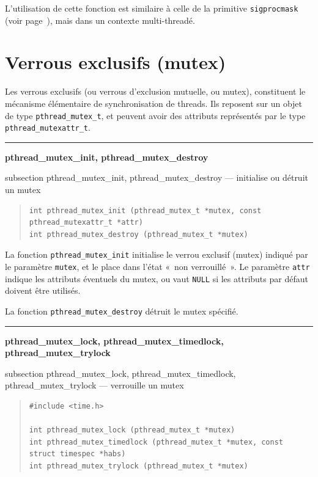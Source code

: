 \documentclass [twoside] {report}
\newcommand {\primitive} [1]
    {
	\phantomsection
	{\large \textbf {#1}}
	\addcontentsline {toc} {subsection} {#1}
    }
\newcommand {\separation}
    {
	\vspace {5mm}
	\nopagebreak
	\hrule
    }
\begin{document}
L'utilisation de cette fonction est similaire à celle de la primitive
\texttt {sigprocmask} (voir page~\pageref {sigprocmask}), mais dans un
contexte multi-threadé.


\section {Verrous exclusifs (mutex)}

Les verrous exclusifs (ou verrous d'exclusion mutuelle, ou mutex),
constituent le mécanisme élémentaire de synchronisation de threads. Ils
reposent sur un objet de type \verb|pthread_mutex_t|, et peuvent avoir
des attributs représentés par le type \verb|pthread_mutexattr_t|.

\separation
\primitive {pthread\_mutex\_init, pthread\_mutex\_destroy} --- initialise ou détruit un mutex

\begin {quote}
\begin {verbatim}
int pthread_mutex_init (pthread_mutex_t *mutex, const pthread_mutexattr_t *attr)
int pthread_mutex_destroy (pthread_mutex_t *mutex)
\end{verbatim}
\end {quote}

La fonction \verb|pthread_mutex_init| initialise le verrou exclusif
(mutex) indiqué par le paramètre \texttt {mutex}, et le place dans
l'état «~non verrouillé~». Le paramètre \texttt {attr} indique les
attributs éventuels du mutex, ou vaut \texttt {NULL} si les attributs
par défaut doivent être utilisés.

La fonction \verb|pthread_mutex_destroy| détruit le mutex spécifié.


\separation
\primitive {pthread\_mutex\_lock, pthread\_mutex\_timedlock, pthread\_mutex\_trylock} --- verrouille un mutex
    \label {pthreadmutextimedlock}

\begin {quote}
\begin {verbatim}
#include <time.h>

int pthread_mutex_lock (pthread_mutex_t *mutex)
int pthread_mutex_timedlock (pthread_mutex_t *mutex, const struct timespec *habs)
int pthread_mutex_trylock (pthread_mutex_t *mutex)
\end{verbatim}
\end {quote}
\end{document}
